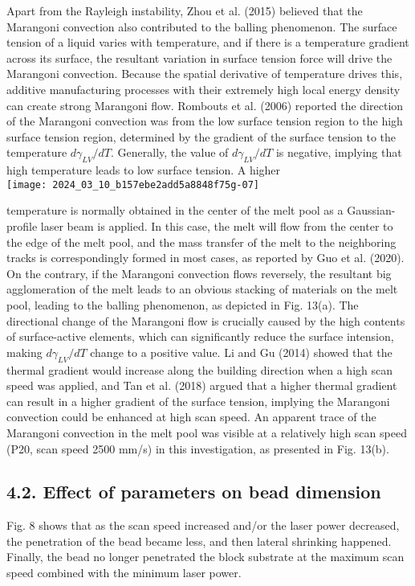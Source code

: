 \documentclass[10pt]{article}
\begin{document}
Apart from the Rayleigh instability, Zhou et al. (2015) believed that the Marangoni convection also contributed to the balling phenomenon. The surface tension of a liquid varies with temperature, and if there is a temperature gradient across its surface, the resultant variation in surface tension force will drive the Marangoni convection. Because the spatial derivative of temperature drives this, additive manufacturing processes with their extremely high local energy density can create strong Marangoni flow. Rombouts et al. (2006) reported the direction of the Marangoni convection was from the low surface tension region to the high surface tension region, determined by the gradient of the surface tension to the temperature $d \gamma_{L V} / d T$. Generally, the value of $d \gamma_{L V} / d T$ is negative, implying that high temperature leads to low surface tension. A higher\\
\texttt{[image: 2024\_03\_10\_b157ebe2add5a8848f75g-07]}

temperature is normally obtained in the center of the melt pool as a Gaussian-profile laser beam is applied. In this case, the melt will flow from the center to the edge of the melt pool, and the mass transfer of the melt to the neighboring tracks is correspondingly formed in most cases, as reported by Guo et al. (2020). On the contrary, if the Marangoni convection flows reversely, the resultant big agglomeration of the melt leads to an obvious stacking of materials on the melt pool, leading to the balling phenomenon, as depicted in Fig. 13(a). The directional change of the Marangoni flow is crucially caused by the high contents of surface-active elements, which can significantly reduce the surface intension, making $d \gamma_{L V} / d T$ change to a positive value. Li and Gu (2014) showed that the thermal gradient would increase along the building direction when a high scan speed was applied, and Tan et al. (2018) argued that a higher thermal gradient can result in a higher gradient of the surface tension, implying the Marangoni convection could be enhanced at high scan speed. An apparent trace of the Marangoni convection in the melt pool was visible at a relatively high scan speed (P20, scan speed 2500 mm/s) in this investigation, as presented in Fig. 13(b).

\subsection*{4.2. Effect of parameters on bead dimension}
Fig. 8 shows that as the scan speed increased and/or the laser power decreased, the penetration of the bead became less, and then lateral shrinking happened. Finally, the bead no longer penetrated the block substrate at the maximum scan speed combined with the minimum laser power.
\end{document}
